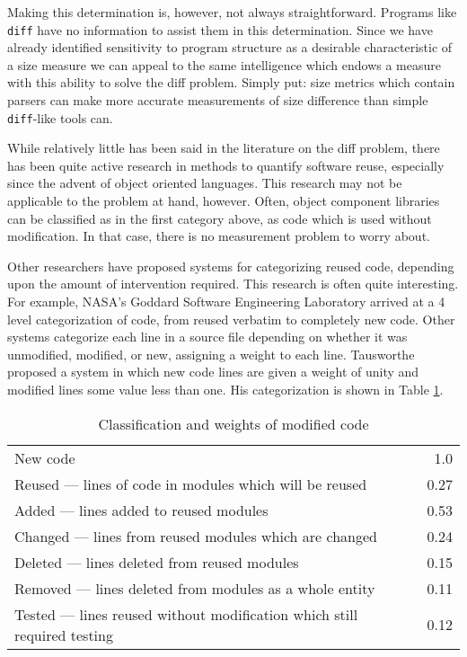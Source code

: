 Making this determination is, however,
not always straightforward.  Programs like {\tt diff} have no information
to assist them in this determination.  Since we have already identified
sensitivity to program structure as a desirable characteristic of a size
measure we can appeal to the same intelligence which endows a measure with
this ability to solve the diff problem.  Simply put: size metrics which
contain parsers can make more accurate measurements of size difference than 
simple {\tt diff\/}-like tools can.

While relatively little has been said in the literature on the diff
problem, there has been quite active research in methods to quantify
software reuse, especially since the advent of object oriented languages.
This research may not be applicable to the problem at hand, however.
Often, object component libraries can be classified as in the first
category above, as code which is used without modification.  In that case,
there is no measurement problem to worry about.

Other researchers have proposed systems for categorizing reused code,
depending upon the amount of intervention required.  This research is
often quite interesting.  For example, NASA's Goddard Software
Engineering Laboratory \cite{Fenton} arrived at a 4 level
categorization of code, from reused verbatim to completely new code.
Other systems categorize each line in a source
file depending on whether it was unmodified, modified, or new,
assigning a weight to each line.  Tausworthe proposed a system in
which new code lines are given a weight of unity and modified lines
some value less than one.  His categorization is shown in Table
\ref{table:taus}. 

\begin{table}
  \centering
  \begin{tabular}{|lr|} 
    \hline
    New code   &  1.0 \\
    Reused --- lines of code in modules which will be reused &  0.27 \\
    Added --- lines added to reused modules & 0.53 \\
    Changed --- lines from reused modules which are changed & 0.24 \\
    Deleted --- lines deleted from reused modules & 0.15 \\
    Removed --- lines deleted from modules as a whole entity & 0.11 \\
    Tested --- lines reused without modification which still required
    testing & 0.12 \\
    \hline
  \end{tabular}
  \caption{Classification and weights of modified code}
  \label{table:taus}
\end{table}
  

